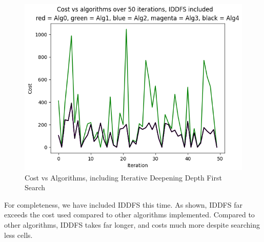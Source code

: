 \documentclass[a4paper]{article}
\begin{document}
\newpage
\begin{figure}[ht]
    \centering
    \includegraphics[width=\textwidth]{CVA50IDDFS.png}
    \caption{Cost vs Algorithms, including Iterative Deepening Depth First Search}
    \label{fig:CostVsAlgsIDDFS}
\end{figure}
For completeness, we have included IDDFS this time. As shown, IDDFS far exceeds the cost used compared to other algorithms implemented. Compared to other algorithms, IDDFS takes far longer, and costs much more despite searching less cells.
\end{document}
